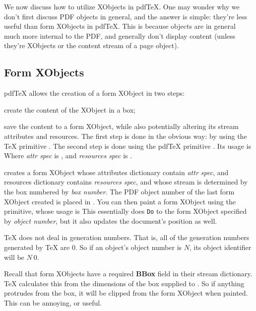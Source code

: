 We now discuss how to utilize XObjects in pdf\TeX.
One may wonder why we don't first discuss PDF objects in general, and the answer is simple: they're less
useful than form XObjects in pdf\TeX.
This is because objects are in general much more internal to the PDF, and generally don't display content
(unless they're XObjects or the content stream of a page object).

\subsection{Form XObjects}

pdf\TeX{} allows the creation of a form XObject in two steps:
\benum
    \item create the content of the XObject in a box;
    \item save the content to a form XObject, while also potentially altering its stream attributes and
    resources.
\eenum
\noindent The first step is done in the obvious way: by using the \TeX{} primitive \macro\setbox.
The second step is done using the pdf\TeX{} primitive \macro\pdfxform.
Its usage is
\noindent Where {\it attr spec} is , and {\it resources spec} is
.

\macro\pdfxform{} creates a form XObject whose attributes dictionary contain {\it attr spec}, and resources
dictionary contains {\it resources spec}, and whose stream is determined by the box numbered by {\it box
number}.
The PDF object number of the last form XObject created is placed in \macro\pdflastxform.
You can then paint a form XObject using the \macro\pdfrefxform{} primitive, whose usage is
\noindent This essentially does {\tt Do} to the form XObject specified by {\it object number}, but it also
updates the document's position as well.

\bnote
    \TeX{} does not deal in generation numbers.
    That is, all of the generation numbers generated by \TeX{} are 0.
    So if an object's object number is $N$, its object identifier will be $N\ 0$.
\eppbox

\bnote
    Recall that form XObjects have a required {\bf BBox} field in their stream dictionary.
    \TeX{} calculates this from the dimensions of the box supplied to \macro\pdfxform.
    So if anything protrudes from the box, it will be clipped from the form XObject when painted.
    This can be annoying, or useful.
\eppbox

